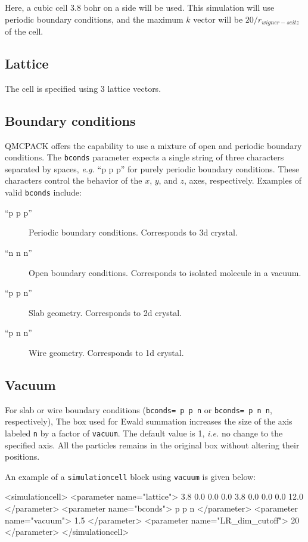 Here, a cubic cell 3.8 bohr on a side will be used.
This simulation will use periodic boundary conditions, and the maximum
$k$ vector will be $20/r_{wigner-seitz}$ of the cell.


\subsection{Lattice}
The cell is specified using 3 lattice vectors.


\subsection{Boundary conditions}
QMCPACK offers the capability to use a mixture of open and periodic boundary conditions.
The \texttt{bconds} parameter expects a single string of three characters separated by
spaces, \textit{e.g.} ``p p p'' for purely periodic boundary conditions. These characters control
the behavior of the $x$, $y$, and $z$, axes, respectively.
Examples of valid \texttt{bconds} include:

\begin{description}
\item[``p p p''] Periodic boundary conditions. Corresponds to 3d crystal.
\item[``n n n''] Open boundary conditions. Corresponds to isolated molecule in a vacuum.
\item[``p p n''] Slab geometry. Corresponds to 2d crystal.
\item[``p n n''] Wire geometry. Corresponds to 1d crystal.
\end{description}

\subsection{Vacuum}
For slab or wire boundary conditions (\texttt{bconds= p p n} or \texttt{bconds= p n n}, respectively),
The box used for Ewald summation increases the size of the axis labeled \texttt{n} by a factor of \texttt{vacuum}.
The default value is 1, \textit{i.e.} no change to the specified axis.
All the particles remains in the original box without altering their positions.

An example of a \texttt{simulationcell} block using \texttt{vacuum} is given below:
\begin{shade}
  <simulationcell>
    <parameter name="lattice">
      3.8       0.0       0.0
      0.0       3.8       0.0
      0.0       0.0      12.0
    </parameter>
    <parameter name="bconds">
       p p n
    </parameter>
    <parameter name="vacuum"> 1.5 </parameter>
    <parameter name="LR_dim_cutoff"> 20 </parameter>
  </simulationcell>
\end{shade}

